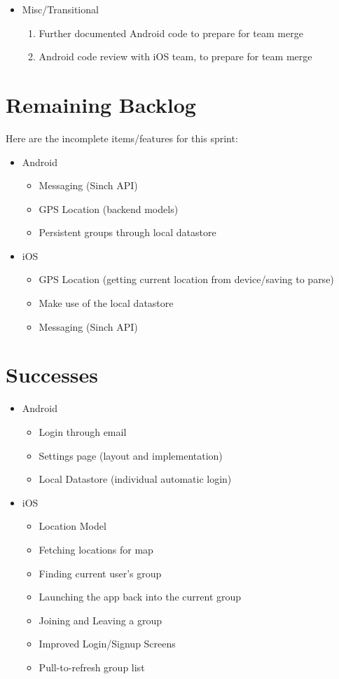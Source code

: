 \documentclass[11pt]{article}
\begin{document}
\begin{itemize}
	\item Misc/Transitional
		\begin{enumerate}
			\item Further documented Android code to prepare for team merge
			\item Android code review with iOS team, to prepare for team merge
		\end{enumerate}

	\end{itemize}

\section*{Remaining Backlog}
Here are the incomplete items/features for this sprint:
	\begin{itemize}
		\item Android
		\begin{itemize}
			\item Messaging (Sinch API)
			\item GPS Location (backend models)
			\item Persistent groups through local datastore
		\end{itemize}
		
		\item iOS 
			\begin{itemize}
			\item GPS Location (getting current location from device/saving to parse)
			\item Make use of the local datastore
			\item Messaging (Sinch API)
			\end{itemize}
	\end{itemize}

\section*{Successes}

	\begin{itemize}
		\item Android
		\begin{itemize}
			\item Login through email
			\item Settings page (layout and implementation)
			\item Local Datastore (individual automatic login)
		\end{itemize}
		
		\item iOS
			\begin{itemize}
			\item Location Model
			\item Fetching locations for map
			\item Finding current user's group
			\item Launching the app back into the current group
			\item Joining and Leaving a group
			\item Improved Login/Signup Screens
			\item Pull-to-refresh group list
			\end{itemize}
	\end{itemize}
\end{document}
